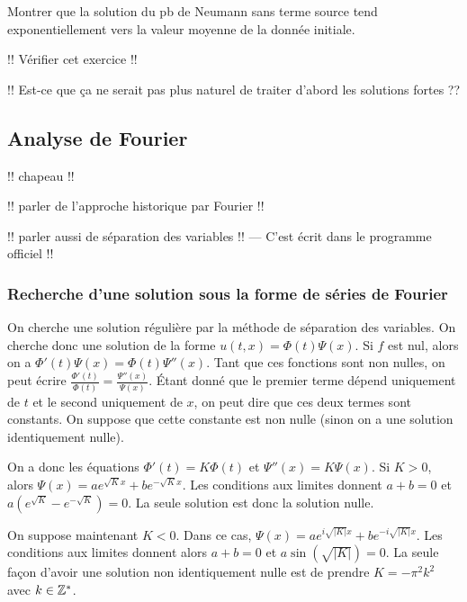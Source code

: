 \documentclass[12pt,a4paper,twoside]{article}
\begin{document}
\begin{exercise}
  Montrer que la solution du pb de Neumann sans terme source
  tend exponentiellement vers la valeur moyenne de la donn\'ee initiale.
\end{exercise}

!! V\'erifier cet exercice !!


!! Est-ce que \c{c}a ne serait pas plus naturel de traiter d'abord les solutions fortes ??

\subsection{Analyse de Fourier}

!! chapeau !!

!! parler de l'approche historique par Fourier !!

!! parler aussi de s\'eparation des variables !! --- C'est \'ecrit dans le programme officiel !!

\subsubsection{Recherche d'une solution sous la forme de s\'eries de Fourier}

On cherche une solution r\'eguli\`ere par la m\'ethode de s\'eparation des variables.
On cherche donc une solution de la forme
$u(t,x) = \Phi(t) \Psi(x)$.
Si $f$ est nul, alors on a $\Phi'(t) \Psi(x) = \Phi(t) \Psi''(x)$.
Tant que ces fonctions sont non nulles, on peut \'ecrire
$\frac{\Phi'(t)}{\Phi(t)} = \frac{\Psi''(x)}{\Psi(x)}$.
\'Etant donn\'e que le premier terme d\'epend uniquement de $t$
et le second uniquement de $x$, on peut dire que ces deux termes sont constants.
On suppose que cette constante est non nulle (sinon on a une solution
identiquement nulle).


On a donc les \'equations
$\Phi'(t) = K \Phi(t)$ et $\Psi''(x) = K \Psi(x)$.
Si $K>0$, alors $\Psi(x) = a e^{\sqrt{K} x} + b e^{- \sqrt{K} x}$.
Les conditions aux limites donnent
$a+b=0$ et $a(e^{\sqrt{K}} - e^{-\sqrt{K}}) = 0$.
La seule solution est donc la solution nulle.


On suppose maintenant $K < 0$.
Dans ce cas, $\Psi(x) = a e^{i\sqrt{|K|} x} + b e^{- i\sqrt{|K|} x}$.
Les conditions aux limites donnent alors $a + b = 0$
et $a \sin(\sqrt{|K|}) = 0$.
La seule fa\c{c}on d'avoir une solution non identiquement nulle
est de prendre $K = - \pi^2 k^2$ avec $k \in \mathbb{Z}^*$.
\end{document}
